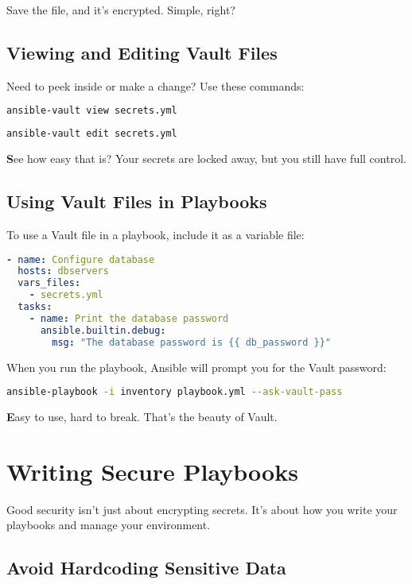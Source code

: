 Save the file, and it's encrypted. Simple, right?

\subsection{Viewing and Editing Vault Files}

Need to peek inside or make a change? Use these commands:
\begin{lstlisting}[language=bash, caption=Viewing a Vault File]
ansible-vault view secrets.yml
\end{lstlisting}
\begin{lstlisting}[language=bash, caption=Editing a Vault File]
ansible-vault edit secrets.yml
\end{lstlisting}

\textbf{S}ee how easy that is? Your secrets are locked away, but you still have full control.

\subsection{Using Vault Files in Playbooks}

To use a Vault file in a playbook, include it as a variable file:
\begin{lstlisting}[language=yaml, caption=Using a Vault File in a Playbook]
- name: Configure database
  hosts: dbservers
  vars_files:
    - secrets.yml
  tasks:
    - name: Print the database password
      ansible.builtin.debug:
        msg: "The database password is {{ db_password }}"
\end{lstlisting}

When you run the playbook, Ansible will prompt you for the Vault password:
\begin{lstlisting}[language=bash, caption=Running a Playbook with Vault]
ansible-playbook -i inventory playbook.yml --ask-vault-pass
\end{lstlisting}

\textbf{E}asy to use, hard to break. That's the beauty of Vault.


\section{Writing Secure Playbooks}

Good security isn't just about encrypting secrets. It's about how you write your playbooks and manage your environment.

\subsection{Avoid Hardcoding Sensitive Data}

